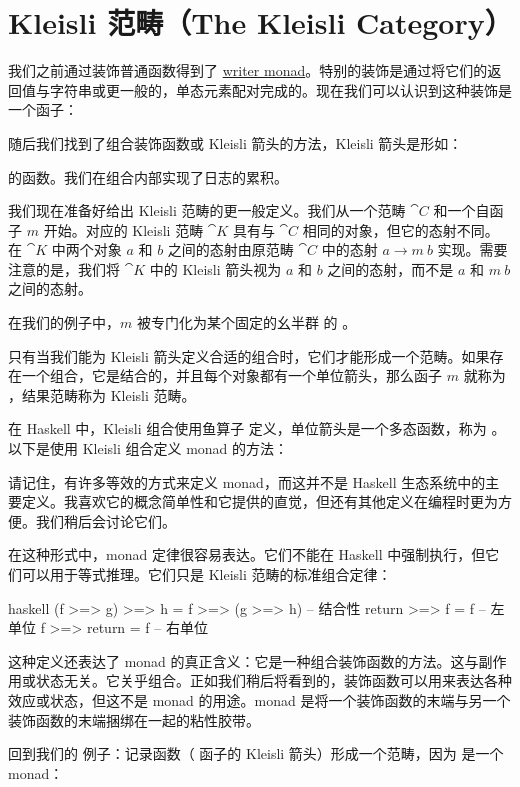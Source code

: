 \section{Kleisli 范畴（The Kleisli Category）}

我们之前通过装饰普通函数得到了 \hyperref[kleisli-categories]{writer monad}。特别的装饰是通过将它们的返回值与字符串或更一般的，单态元素配对完成的。现在我们可以认识到这种装饰是一个函子：

随后我们找到了组合装饰函数或 Kleisli 箭头的方法，Kleisli 箭头是形如：

的函数。我们在组合内部实现了日志的累积。

我们现在准备好给出 Kleisli 范畴的更一般定义。我们从一个范畴 $\cat{C}$ 和一个自函子 $m$ 开始。对应的 Kleisli 范畴 $\cat{K}$ 具有与 $\cat{C}$ 相同的对象，但它的态射不同。在 $\cat{K}$ 中两个对象 $a$ 和 $b$ 之间的态射由原范畴 $\cat{C}$ 中的态射 $a \to m\ b$ 实现。需要注意的是，我们将 $\cat{K}$ 中的 Kleisli 箭头视为 $a$ 和 $b$ 之间的态射，而不是 $a$ 和 $m\ b$ 之间的态射。

在我们的例子中，$m$ 被专门化为某个固定的幺半群  的 。

只有当我们能为 Kleisli 箭头定义合适的组合时，它们才能形成一个范畴。如果存在一个组合，它是结合的，并且每个对象都有一个单位箭头，那么函子 $m$ 就称为 ，结果范畴称为 Kleisli 范畴。

在 Haskell 中，Kleisli 组合使用鱼算子 \code{>=>} 定义，单位箭头是一个多态函数，称为 。以下是使用 Kleisli 组合定义 monad 的方法：

请记住，有许多等效的方式来定义 monad，而这并不是 Haskell 生态系统中的主要定义。我喜欢它的概念简单性和它提供的直觉，但还有其他定义在编程时更为方便。我们稍后会讨论它们。

在这种形式中，monad 定律很容易表达。它们不能在 Haskell 中强制执行，但它们可以用于等式推理。它们只是 Kleisli 范畴的标准组合定律：

\begin{snip}{haskell}
(f >=> g) >=> h = f >=> (g >=> h) -- 结合性
return >=> f = f                  -- 左单位
f >=> return = f                  -- 右单位
\end{snip}
这种定义还表达了 monad 的真正含义：它是一种组合装饰函数的方法。这与副作用或状态无关。它关乎组合。正如我们稍后将看到的，装饰函数可以用来表达各种效应或状态，但这不是 monad 的用途。monad 是将一个装饰函数的末端与另一个装饰函数的末端捆绑在一起的粘性胶带。

回到我们的  例子：记录函数（ 函子的 Kleisli 箭头）形成一个范畴，因为  是一个 monad：


